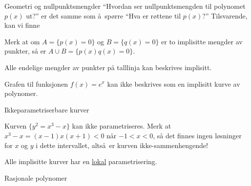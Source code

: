 \documentclass[norsk, handout]{beamer}
\theoremstyle{example}
\begin{document}
\begin{frame}{Geometri og nullpunktsmengder}
    ``Hvordan ser nullpunktsmengden til polynomet $p(x)$ ut?''
    er det samme som å spørre ``Hva er røttene til $p(x)$?''
    Tilsvarende, kan vi finne
    \begin{example}
        Merk at om $A = \{ p(x) = 0 \}$
        og $B = \{ q(x) = 0\}$
        er to implisitte mengder av punkter,
        så er $A\cup B = \{ p(x) q(x) = 0 \}$.
    \end{example}
    \begin{corollary}
        Alle endelige mengder av punkter på talllinja kan
        beskrives implisitt.
    \end{corollary}
    \begin{example}
        Grafen til funksjonen $f(x) = e^x$ kan ikke beskrives
        som en implisitt kurve av polynomer.
    \end{example}
\end{frame}

\begin{frame}{Ikkeparametriserbare kurver}
    \begin{example}
        Kurven $\{ y^2 = x^3 - x\}$ kan ikke parametriseres.
        Merk at $x^3 - x = (x - 1)x(x + 1) < 0$
        når $-1 < x < 0$,
        så det finnes ingen løsninger for $x$ og $y$ i dette intervallet,
        altså er kurven ikke-sammenhengende!
    \end{example}
    \begin{theorem}
        Alle implisitte kurver har en \underline{lokal}
        parametrisering.
    \end{theorem}
\end{frame}

\begin{frame}{Rasjonale polynomer}
\end{frame}

\frame{\printbibliography}
\end{document}
